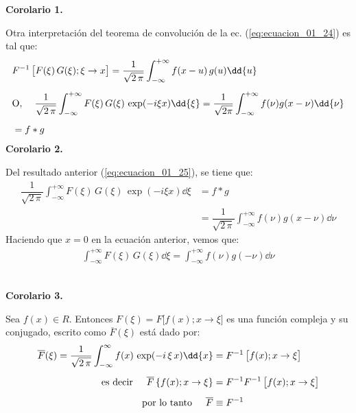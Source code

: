 \textbf{Corolario 1.}

Otra interpretación del teorema de convolución de la ec. (\ref{eq:ecuacion_01_24}) es tal que:
\begin{align}
\begin{aligned}[b]
&F^{-1} \, \big[F(\xi) \, G(\xi); \xi \to x\big] = \dfrac{1}{\sqrt{2 \, \pi}} \int_{-\infty}^{+\infty} f(x - u) \, g(u) \dd{u} \\[0.5em]
&\mbox{O}, \hspace{0.4cm} \dfrac{1}{\sqrt{2 \, \pi}} \int_{-\infty}^{+\infty} F(\xi) \, G(\xi) \, \exp(- i \xi x) \dd{\xi} = \dfrac{1}{\sqrt{2 \pi}} \int_{-\infty}^{+\infty} f(\nu) g(x - \nu) \dd{\nu} \\[0.5em]
&= f * g
\end{aligned}
\label{eq:ecuacion_01_25}
\end{align}
\newpage
\textbf{Corolario 2.}

Del resultado anterior (\ref{eq:ecuacion_01_25}), se tiene que:
\begin{align*}
\dfrac{1}{\sqrt{2 \, \pi}} \int_{-\infty}^{+\infty} F(\xi) \, G(\xi) \, \exp(- i \xi x) \dd{\xi} &= f * g \\[0.5em]
&= \dfrac{1}{\sqrt{2 \, \pi}} \int_{-\infty}^{+\infty} f(\nu) g(x - \nu) \dd{\nu}
\end{align*}
Haciendo que $x = 0$ en la ecuación anterior, vemos que:
\begin{align}
\int_{-\infty}^{+\infty} F(\xi) \, G(\xi) \dd{\xi} = \int_{-\infty}^{+\infty} f(\nu) g(-\nu) \dd{\nu}
\label{eq:ecuacion_01_26}
\end{align}
\\
\bigskip

\textbf{Corolario 3.}

Sea $f(x) \in R$. Entonces $F(\xi) = F \big[f(x); x \to \xi\big]$ es una función compleja y su conjugado, escrito como $\overline{F}(\xi)$ está dado por:
\begin{align}
\begin{aligned}[b]
\overline{F}(\xi) = \dfrac{1}{\sqrt{2 \, \pi}} \int_{-\infty}^{\infty} f(x) \, \exp(-i \, \xi \, x) \dd{x} &= F^{-1} \, \big[f(x); x \to \xi\big] \\[0.5em]
\mbox{es decir} \hspace{0.5cm} \overline{F} \left\{f(x); x \to \xi \right\} &= F^{-1} F^{-1} \, \big[f(x); x \to \xi \big] \\[0.5em]
\mbox{por lo tanto} \hspace{0.5cm} \overline{F} &\equiv F^{-1}
\end{aligned}
\label{eq:ecuacion_01_27}
\end{align}
\\
\bigskip

